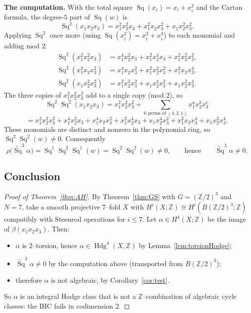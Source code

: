 \documentclass[11pt]{article}
\theoremstyle{definition}
\DeclareMathOperator{\Sq}{Sq}
\DeclareMathOperator{\Hdg}{Hdg}
\newcommand{\Z}{\mathbb{Z}}
\begin{document}
\smallskip\noindent\textbf{The computation.} With the total square
$\Sq(x_i)=x_i+x_i^2$ and the Cartan formula, the degree‑$5$ part of $\Sq(w)$ is
\[
  \Sq^2(x_1x_2x_3)=x_1^2x_2^2x_3+x_1^2x_2x_3^2+x_1x_2^2x_3^2 .
\]
Applying $\Sq^2$ once more (using $\Sq(x_i^2)=x_i^2+x_i^4$) to each monomial and
adding mod $2$:
\[
\begin{aligned}
\Sq^2(x_1^2x_2^2x_3)&=x_1^4x_2^2x_3+x_1^2x_2^4x_3+x_1^2x_2^2x_3^2,\\
\Sq^2(x_1^2x_2x_3^2)&=x_1^4x_2x_3^2+x_1^2x_2^2x_3^2+x_1^2x_2x_3^4,\\
\Sq^2(x_1x_2^2x_3^2)&=x_1^2x_2^2x_3^2+x_1x_2^4x_3^2+x_1x_2^2x_3^4 .
\end{aligned}
\]
The three copies of $x_1^2x_2^2x_3^2$ add to a single copy (mod $2$), so
\[
  \boxed{\;\Sq^2\Sq^2(x_1x_2x_3)=x_1^2x_2^2x_3^2
  +\!\!\sum_{\text{$6$ perms of }(4,2,1)}\!\! x_1^{a}x_2^{b}x_3^{c}\;}
\]
\[
=x_1^2x_2^2x_3^2
+x_1^4x_2^2x_3+x_1^4x_2x_3^2+x_1^2x_2^4x_3+x_1x_2^4x_3^2+x_1^2x_2x_3^4+x_1x_2^2x_3^4 .
\]
These monomials are distinct and nonzero in the polynomial ring, so
$\Sq^2\Sq^2(w)\neq 0$. Consequently
\[
  \rho\big(\widetilde{\Sq}^3\alpha\big)=\Sq^1\Sq^2\Sq^1(w)=\Sq^2\Sq^2(w)\neq 0,
  \qquad\text{hence}\qquad \widetilde{\Sq}^3\alpha\neq 0 .
\]

\subsection{Conclusion}

\begin{proof}[Proof of Theorem~\ref{thm:AH}]
By Theorem~\ref{thm:GS} with $G=(\Z/2)^3$ and $N=7$, take a smooth projective
$7$--fold $X$ with $H^i(X;\Z)\cong H^i(B(\Z/2)^3;\Z)$ compatibly with Steenrod
operations for $i\le 7$. Let $\alpha\in H^4(X;\Z)$ be the image of
$\beta(x_1x_2x_3)$. Then:
\begin{itemize}
\item $\alpha$ is $2$--torsion, hence $\alpha\in\Hdg^4(X,\Z)$ by
Lemma~\ref{lem:torsionHodge};
\item $\widetilde{\Sq}^3\alpha\neq 0$ by the computation above (transported from
$B(\Z/2)^3$);
\item therefore $\alpha$ is not algebraic, by Corollary~\ref{cor:test}.
\end{itemize}
So $\alpha$ is an integral Hodge class that is not a $\Z$--combination of
algebraic cycle classes: the IHC fails in codimension $2$.
\end{proof}
\end{document}
